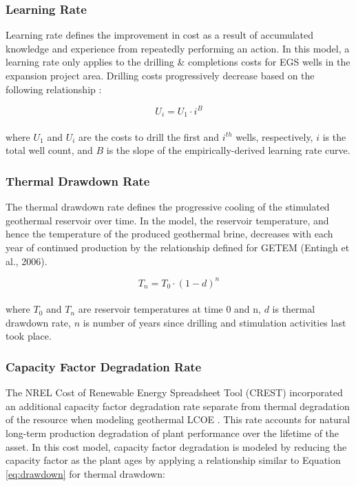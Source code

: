 \subsubsection{Learning Rate}
\label{ch4:learn_rate}

Learning rate defines the improvement in cost as a result of accumulated knowledge and experience from repeatedly performing an action. In this model, a learning rate only applies to the drilling \& completions costs for EGS wells in the expansion project area. Drilling costs progressively decrease based on the following relationship \citep[p.\ 213]{de_neufville_flexibility_2011}:

\begin{equation}
    \label{eq:learning_rate}
    U_i = U_1 \cdot i^B
\end{equation}
\\
where $U_1$ and $U_i$ are the costs to drill the first and $i^{th}$ wells, respectively, $i$ is the total well count, and $B$ is the slope of the empirically-derived learning rate curve.

\subsubsection{Thermal Drawdown Rate}
\label{ch4:drawdown_rate}

The thermal drawdown rate defines the progressive cooling of the stimulated geothermal reservoir over time. In the model, the reservoir temperature, and hence the temperature of the produced geothermal brine, decreases with each year of continued production by the relationship defined for GETEM (Entingh et al., 2006).

\begin{equation}
    \label{eq:drawdown}
    T_n = T_0 \cdot (1-d)^n
\end{equation}
\\
where $T_0$ and $T_n$ are reservoir temperatures at time 0 and n, $d$ is thermal drawdown rate, $n$ is number of years since drilling and stimulation activities last took place.

\subsubsection{Capacity Factor Degradation Rate}
\label{ch4:degrade_rate}

The NREL Cost of Renewable Energy Spreadsheet Tool (CREST) incorporated an additional capacity factor degradation rate separate from thermal degradation of the resource when modeling geothermal LCOE \citep{gifford_crest_2013}. This rate accounts for natural long-term production degradation of plant performance over the lifetime of the asset. In this cost model, capacity factor degradation is modeled by reducing the capacity factor as the plant ages by applying a relationship similar to Equation \ref{eq:drawdown} for thermal drawdown:

